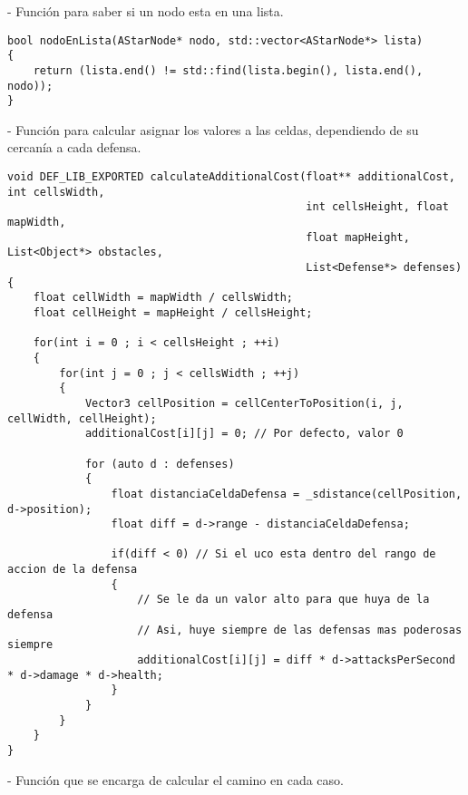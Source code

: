 - Función para saber si un nodo esta en una lista.

\lstset{language=C++, texcl=true}
\begin{lstlisting}[frame=single]
bool nodoEnLista(AStarNode* nodo, std::vector<AStarNode*> lista)
{
    return (lista.end() != std::find(lista.begin(), lista.end(), nodo));
}
\end{lstlisting}

- Función para calcular asignar los valores a las celdas, dependiendo de su cercanía
a cada defensa.

\lstset{language=C++, texcl=true}
\begin{lstlisting}[frame=single]
void DEF_LIB_EXPORTED calculateAdditionalCost(float** additionalCost, int cellsWidth,
                                              int cellsHeight, float mapWidth,
                                              float mapHeight, List<Object*> obstacles,
                                              List<Defense*> defenses)
{
    float cellWidth = mapWidth / cellsWidth;
    float cellHeight = mapHeight / cellsHeight;
    
    for(int i = 0 ; i < cellsHeight ; ++i)
    {
        for(int j = 0 ; j < cellsWidth ; ++j)
        {
            Vector3 cellPosition = cellCenterToPosition(i, j, cellWidth, cellHeight);
            additionalCost[i][j] = 0; // Por defecto, valor 0
            
            for (auto d : defenses)
            {
                float distanciaCeldaDefensa = _sdistance(cellPosition, d->position);
                float diff = d->range - distanciaCeldaDefensa;
                
                if(diff < 0) // Si el uco esta dentro del rango de accion de la defensa
                {
                    // Se le da un valor alto para que huya de la defensa
                    // Asi, huye siempre de las defensas mas poderosas siempre
                    additionalCost[i][j] = diff * d->attacksPerSecond * d->damage * d->health;
                }
            }
        }
    }
}
\end{lstlisting}

- Función que se encarga de calcular el camino en cada caso.

